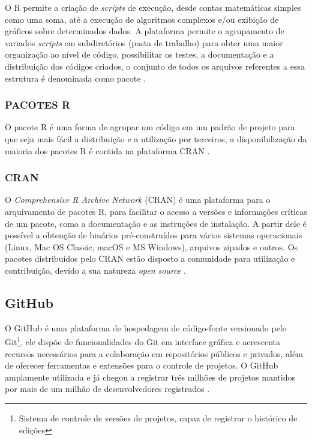 O R permite a criação de \textit{scripts} de execução, desde contas matemáticas simples como uma soma, até a execução de algoritmos complexos e/ou exibição de gráficos sobre determinados dados. A plataforma permite o agrupamento de variados \textit{scripts} em subdiretórios (pasta de trabalho) para obter uma maior organização ao nível de código, possibilitar os testes, a documentação e a distribuição dos códigos criados, o conjunto de todos os arquivos referentes a essa estrutura é denominada como pacote \cite{website:Hornik2018}.

\subsubsection{PACOTES R}

O pacote R é uma forma de agrupar um código em um padrão de projeto para que seja mais fácil a distribuição e a utilização por terceiros, a disponibilização da maioria dos pacotes R é contida na plataforma CRAN \cite{website:Hornik2018}.



\subsubsection{CRAN}

O \textit{Comprehensive R Archive Network} (CRAN) é uma plataforma para o arquivamento de pacotes R, para facilitar o acesso a versões e informações críticas de um pacote, como a documentação e as instruções de instalação. A partir dele é possível a obtenção de binários pré-construídos para vários sistemas operacionais (Linux, Mac OS Classic, macOS e MS Windows), arquivos zipados e outros. Os pacotes distribuídos pelo CRAN estão disposto a comunidade para utilização e contribuição, devido a sua natureza \textit{open source} \cite{website:Hornik2018}.

\subsection{GitHub}

O GitHub \cite{GitHub2019} é uma plataforma de hospedagem de código-fonte versionado pelo Git\footnote{Sistema de controle de versões de projetos, capaz de registrar o histórico de edições}, ele dispõe de funcionalidades do Git em interface gráfica e acrescenta recursos necessários para a colaboração em repositórios públicos e privados, além de oferecer ferramentas e extensões para o controle de projetos. O GitHub amplamente utilizada e já chegou a registrar três milhões de projetos mantidos por mais de um milhão de desenvolvedores registrados \cite{Thung2013}.

